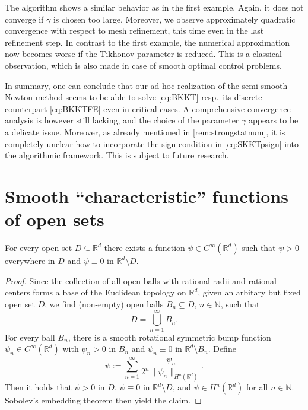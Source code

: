 \documentclass[reqno]{shinyart}
\begin{document}
The algorithm shows a similar behavior as in the first example. Again, it does not converge if 
$\gamma$ is chosen too large. Moreover, we observe approximately quadratic convergence 
with respect to mesh refinement, this time even in the last refinement step.
In contrast to the first example, the numerical approximation now becomes worse if 
the Tikhonov parameter is reduced. This is a classical observation, which is also made 
in case of smooth optimal control problems.

In summary, one can conclude that our ad hoc realization of the semi-smooth Newton method 
seems to be able to solve \eqref{eq:BKKT} resp.\ its discrete counterpart \eqref{eq:BKKTFE} 
even in critical cases. A comprehensive convergence analysis is however still lacking,
and the choice of the parameter $\gamma$ appears to be a delicate issue.
Moreover, as already mentioned in \cref{rem:strongstatnum}, it is completely unclear 
how to incorporate the sign condition in \eqref{eq:SKKTpsign} into the algorithmic framework. 
This is subject to future research.

\appendix
\section{Smooth ``characteristic'' functions of open sets}

\begin{lemma}\label{lem:randomlemma}
    For every open set $D \subseteq {\mathbb{R}}^d$  
    there exists a function $\psi \in C^\infty({\mathbb{R}}^d)$ 
    such that $\psi > 0$ everywhere in $D$ and $\psi \equiv 0$ in ${\mathbb{R}}^d \setminus D$.
\end{lemma}

\begin{proof}
    Since the collection of all open balls with rational radii and rational centers 
    forms a base of the Euclidean topology on ${\mathbb{R}}^d$, 
    given an arbitary but fixed open set $D$, we find (non-empty) open balls 
    $B_n \subseteq D$, $n \in \mathbb{N}$, such that 
    \begin{equation*}
        D = \bigcup_{n=1}^\infty B_n.
    \end{equation*}
    For every ball $B_n$, there is a smooth rotational symmetric bump function 
    $\psi_n \in C^\infty({\mathbb{R}}^d)$ with $\psi_n > 0$ in $B_n$ 
    and $\psi_n \equiv 0 $ in ${\mathbb{R}}^d \setminus B_n$. Define
    \begin{equation*}
        \psi := \sum_{n=1}^\infty \frac{\psi_n}{2^n \|\psi_n\|_{H^n({\mathbb{R}}^d)}}.
    \end{equation*}
    Then it holds that $\psi > 0$ in $D$, $\psi \equiv 0$ in ${\mathbb{R}}^d \setminus D$, 
    and $\psi \in H^n({\mathbb{R}}^d)$ for all $n\in {\mathbb{N}}$. Sobolev's embedding theorem then yield the claim.
\end{proof}
\end{document}
